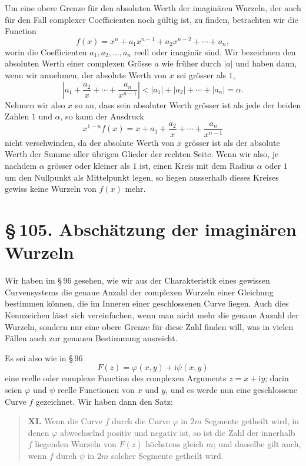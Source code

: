 \documentclass[11pt]{article}
\providecommand{\ii}{\mathrm{i}}
\providecommand{\sect}[2]{\section*{\S\,#1. #2}}
\begin{document}
Um eine obere Grenze für den absoluten Werth der imaginären Wurzeln, der auch für den Fall complexer Coefficienten noch gültig ist, zu finden, betrachten wir die Function
\[
        f(x)=x^n+a_1x^{n-1}+a_2x^{n-2}+\cdots+a_n,
\]
worin die Coefficienten $a_1,a_2,\ldots,a_n$ reell oder imaginär sind. Wir bezeichnen den absoluten Werth einer complexen Grösse $a$ wie früher durch $|a|$ und haben dann, wenn wir annehmen, der absolute Werth von $x$ sei grösser als $1$,
\[
        \left|a_1+\frac{a_2}{x}+\cdots+\frac{a_n}{x^{n-1}}\right|
        < |a_1|+|a_2|+\cdots+|a_n|=\alpha.
\]
Nehmen wir also $x$ so an, dass sein absoluter Werth grösser ist als jede der beiden Zahlen $1$ und $\alpha$, so kann der Ausdruck
\[
        x^{1-n}f(x)=x+a_1+\frac{a_2}{x}+\cdots+\frac{a_n}{x^{n-1}}
\]
nicht verschwinden, da der absolute Werth von $x$ grösser ist als der absolute Werth der Summe aller übrigen Glieder der rechten Seite. Wenn wir also, je nachdem $\alpha$ grösser oder kleiner als $1$ ist, einen Kreis mit dem Radius $\alpha$ oder $1$ um den Nullpunkt als Mittelpunkt legen, so liegen ausserhalb dieses Kreises gewiss keine Wurzeln von $f(x)$ mehr.

\sect{105}{Abschätzung der imaginären Wurzeln}

Wir haben im \S\,96 gesehen, wie wir aus der Charakteristik eines gewissen Curvensystems die genaue Anzahl der complexen Wurzeln einer Gleichung bestimmen können, die im Inneren einer geschlossenen Curve liegen. Auch dies Kennzeichen lässt sich vereinfachen, wenn man nicht mehr die genaue Anzahl der Wurzeln, sondern nur eine obere Grenze für diese Zahl finden will, was in vielen Fällen auch zur genauen Bestimmung ausreicht.

Es sei also wie in \S\,96
\begin{equation}
        F(z)=\varphi(x,y)+\ii\psi(x,y)
\tag{1}
\end{equation}
eine reelle oder complexe Function des complexen Arguments $z=x+\ii y$; darin seien $\varphi$ und $\psi$ reelle Functionen von $x$ und $y$, und es werde nun eine geschlossene Curve $f$ gezeichnet. Wir haben dann den Satz:

\begin{quote}
\textbf{XI.} Wenn die Curve $f$ durch die Curve $\varphi$ in $2m$ Segmente getheilt wird, in denen $\varphi$ abwechselnd positiv und negativ ist, so ist die Zahl der innerhalb $f$ liegenden Wurzeln von $F(z)$ höchstens gleich $m$; und dasselbe gilt auch, wenn $f$ durch $\psi$ in $2m$ solcher Segmente getheilt wird.
\end{quote}
\end{document}
